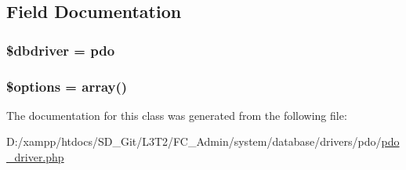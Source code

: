 \subsection{Field Documentation}
\hypertarget{class_c_i___d_b__pdo__driver_a0cde2a16322a023d040aa7f725877597}{}
\subsubsection[{\$dbdriver}]{\setlength{\rightskip}{0pt plus 5cm}\$dbdriver = \textquotesingle{}pdo\textquotesingle{}}\label{class_c_i___d_b__pdo__driver_a0cde2a16322a023d040aa7f725877597}
\hypertarget{class_c_i___d_b__pdo__driver_a011800c63ece4cbbfa77136a20607023}{}
\subsubsection[{\$options}]{\setlength{\rightskip}{0pt plus 5cm}\$options = array()}\label{class_c_i___d_b__pdo__driver_a011800c63ece4cbbfa77136a20607023}


The documentation for this class was generated from the following file\+:\begin{DoxyCompactItemize}
\item 
D\+:/xampp/htdocs/\+S\+D\+\_\+\+Git/\+L3\+T2/\+F\+C\+\_\+\+Admin/system/database/drivers/pdo/\hyperlink{pdo__driver_8php}{pdo\+\_\+driver.\+php}\end{DoxyCompactItemize}
